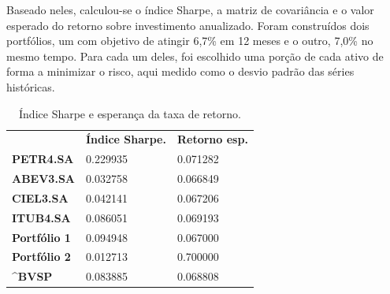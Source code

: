 \documentclass{article}
\begin{document}
Baseado neles, calculou-se o índice Sharpe, a matriz de covariância e o valor esperado do retorno sobre investimento anualizado.
Foram construídos dois portfólios, um com objetivo de atingir 6,7\% em 12 meses e o outro, 7,0\% no mesmo tempo.
Para cada um deles, foi escolhido uma porção de cada ativo de forma a minimizar o risco, aqui medido como o desvio padrão das séries históricas. 


\begin{table}[H]
	\centering
	\begin{tabular}{lll}
	 & \textbf{Índice Sharpe.}& \textbf{Retorno esp.} \\
	\textbf{PETR4.SA} & 0.229935 & 0.071282 \\
	\textbf{ABEV3.SA} & 0.032758 & 0.066849 \\
	\textbf{CIEL3.SA} & 0.042141 & 0.067206 \\
	\textbf{ITUB4.SA} & 0.086051 & 0.069193 \\
	\textbf{Portfólio 1} & 0.094948 & 0.067000 \\
	\textbf{Portfólio 2} & 0.012713 & 0.700000 \\
	\textbf{\^{}BVSP} & 0.083885 & 0.068808
	\end{tabular}
	\caption{Índice Sharpe e esperança da taxa de retorno.}
	\label{tab:my-table}
\end{table}
\end{document}
